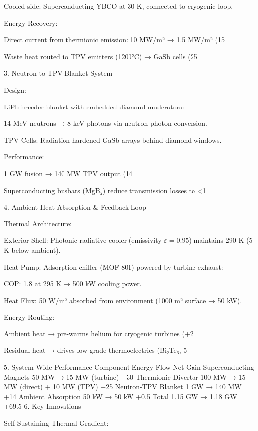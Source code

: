 \documentclass{article}%
\begin{document}
            Cooled side: Superconducting YBCO at 30 K, connected to cryogenic loop.

        Energy Recovery:

            Direct current from thermionic emission: 10 MW/m² → 1.5 MW/m² (15%

            Waste heat routed to TPV emitters (1200°C) → GaSb cells (25%

3. Neutron-to-TPV Blanket System

    Design:

        LiPb breeder blanket with embedded diamond moderators:

            14 MeV neutrons → 8 keV photons via neutron-photon conversion.

        TPV Cells: Radiation-hardened GaSb arrays behind diamond windows.

        Performance:

            1 GW fusion → 140 MW TPV output (14%

            Superconducting busbars (MgB₂) reduce transmission losses to <1%

4. Ambient Heat Absorption & Feedback Loop

    Thermal Architecture:

        Exterior Shell: Photonic radiative cooler (emissivity \( \varepsilon = 0.95 \)) maintains 290 K (5 K below ambient).

        Heat Pump: Adsorption chiller (MOF-801) powered by turbine exhaust:

            COP: 1.8 at 295 K → 500 kW cooling power.

            Heat Flux: 50 W/m² absorbed from environment (1000 m² surface → 50 kW).

        Energy Routing:

            Ambient heat → pre-warms helium for cryogenic turbines (+2%

            Residual heat → drives low-grade thermoelectrics (Bi₂Te₃, 5%

5. System-Wide Performance
Component	Energy Flow	Net Gain
Superconducting Magnets	50 MW → 15 MW (turbine)	+30%
Thermionic Divertor	100 MW → 15 MW (direct) + 10 MW (TPV)	+25%
Neutron-TPV Blanket	1 GW → 140 MW	+14%
Ambient Absorption	50 kW → 50 kW	+0.5%
Total	1.15 GW → 1.18 GW	+69.5%
6. Key Innovations

    Self-Sustaining Thermal Gradient:
\end{document}
